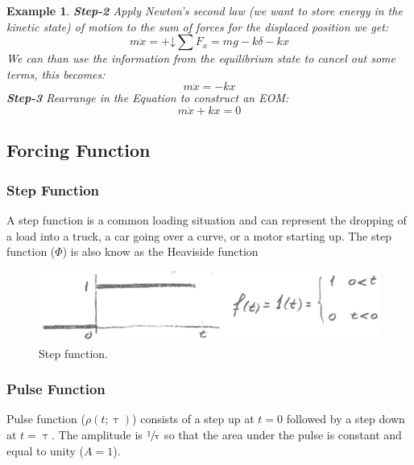 \documentclass[12pt,letter]{article}
\newtheorem{ex}{Example}
\numberwithin{ex}{section} %
\newenvironment{example}{\begin{mdframed}[middlelinewidth=0.5mm]\begin{ex}\normalfont}{\end{ex}\end{mdframed}}
\numberwithin{re}{section} %
\newcommand*\downplus{%
  \mathbin{+\mathord\downarrow}}								%
\numberwithin{equation}{section}	%
\begin{document}
\begin{example}
			\noindent \textbf{Step-2} Apply Newton's second law (we want to store energy in the kinetic state) of motion to the sum of forces for the displaced position we get: 		
			\begin{equation}
				m\ddot{x} = \downplus \sum F_x =mg -k\delta -kx
			\end{equation}
			We can than use the information from the equilibrium state to cancel out some terms, this becomes:
			\begin{equation}
				m\ddot{x} = -kx
			\end{equation}				
			\textbf{Step-3} Rearrange in the Equation to construct an EOM: 					
			\begin{equation}
				m\ddot{x} + kx = 0
			\end{equation}			
		\end{example}	




\subsection{Forcing Function}

\subsubsection{Step Function}

A step function is a common loading situation and can represent the dropping of a load into a truck, a car going over a curve, or a motor starting up. The step function ($\Phi$) is also know as the Heaviside function

\begin{figure}[H]
	\centering
	\includegraphics[width=6.5in]{../figures/step.png}
	\caption{Step function.}
\end{figure}



\subsubsection{Pulse Function}

Pulse function ($\rho(t;\uptau)$) consists of a step up at $t=0$ followed by a step down at $t=\uptau$. The amplitude is $\sfrac{1}{\uptau}$ so that the area under the pulse is constant and equal to unity ($A=1$). 
\end{document}
